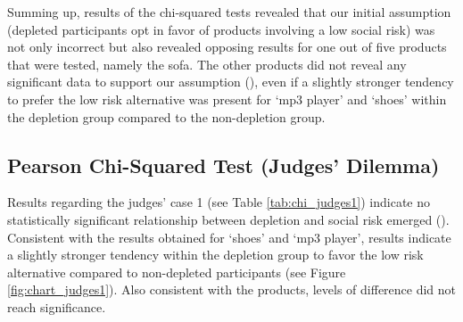Summing up, results of the chi-squared tests revealed that our initial assumption (depleted participants opt in favor of products involving a low social risk) was not only incorrect but also revealed opposing results for one out of five products that were tested, namely the sofa. The other products did not reveal any significant data to support our assumption (), even if a slightly stronger tendency to prefer the low risk alternative was present for ‘mp3 player’ and ‘shoes’ within the depletion group compared to the non-depletion group.\par
\FloatBarrier
\subsection{Pearson Chi-Squared Test (Judges’ Dilemma)}\label{sec:pearson_chi_judges}
Results regarding the judges’ case 1 (see Table \ref{tab:chi_judges1}) indicate no statistically significant relationship between depletion and social risk emerged (). Consistent with the results obtained for ‘shoes’ and ‘mp3 player’, results indicate a slightly stronger tendency within the depletion group to favor the low risk alternative compared to non-depleted participants (see Figure \ref{fig:chart_judges1}). Also consistent with the products, levels of difference did not reach significance.

